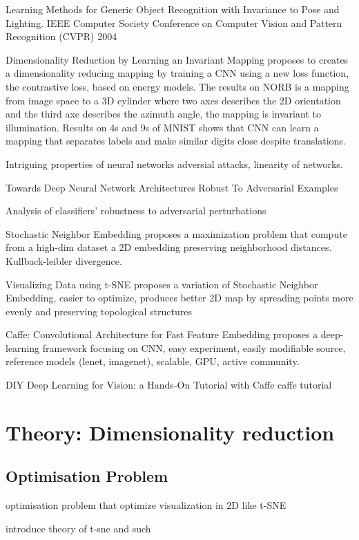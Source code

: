 \documentclass[a4paper,12pt]{report}
\begin{document}
Learning Methods for Generic Object Recognition with Invariance to Pose and Lighting. IEEE Computer Society Conference on Computer Vision and Pattern Recognition (CVPR) 2004

Dimensionality Reduction by Learning an Invariant Mapping
proposes to creates a dimensionality reducing mapping by training a CNN using a new loss function, the contrastive loss, based on energy models. The results on NORB is a mapping from image space to a 3D cylinder where two axes describes the 2D orientation and the third axe describes the azimuth angle, the mapping is invariant to illumination. Results on 4s and 9s of MNIST shows that CNN can learn a mapping that separates labels and make similar digits close despite translations.

Intriguing properties of neural networks
adversial attacks, linearity of networks.

Towards Deep Neural Network Architectures Robust To Adversarial Examples

Analysis of classifiers' robustness to adversarial perturbations

Stochastic Neighbor Embedding
proposes a maximization problem that compute from a high-dim dataset a 2D embedding preserving neighborhood distances. Kullback-leibler divergence.

Visualizing Data using t-SNE
proposes a variation of Stochastic Neighbor Embedding, easier to optimize, produces better 2D map by spreading points more evenly and preserving topological structures

Caffe: Convolutional Architecture for Fast Feature Embedding
proposes a deep-learning framework focusing on CNN, easy experiment, easily modifiable source, reference models (lenet, imagenet), scalable, GPU, active community.

DIY Deep Learning for Vision: a Hands-On Tutorial with Caffe
caffe tutorial

\chapter{Theory: Dimensionality reduction}

\section{Optimisation Problem}
optimisation problem that optimize visualization in 2D like t-SNE

introduce theory of t-sne and such
\end{document}
